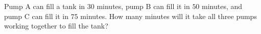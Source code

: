 Pump A can fill a tank in $30$ minutes, pump B can fill it in $50$ minutes, and pump C can fill it in $75$ minutes. How many minutes will it take all three pumps working together to fill the tank?

